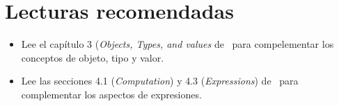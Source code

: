 \section{Lecturas recomendadas}

\begin{itemize}

\item Lee el capítulo 3 (\emph{Objects, Types, and values} de~\cite{stroustrup:2014}
      para compelementar los conceptos de objeto, tipo y valor.

\item Lee las secciones 4.1 (\emph{Computation}) y 4.3 (\emph{Expressions}) 
      de~\cite{stroustrup:2014} para complementar los aspectos de expresiones.

\end{itemize}
